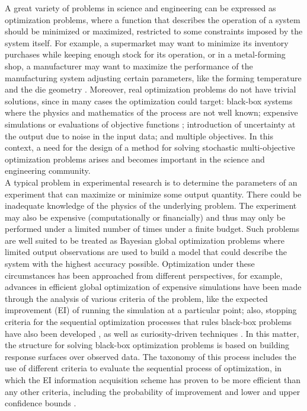\documentclass{article}
\begin{document}
A great variety of problems in science and engineering can be expressed as optimization problems, where a function that describes the operation of a system should be minimized or maximized, restricted to some constraints imposed by the system itself. For example, a supermarket may want to minimize its inventory purchases while keeping enough stock for its operation, or in a metal-forming shop, a manufacturer may want to maximize the performance of the manufacturing system adjusting certain parameters, like the forming temperature and the die geometry \cite{Huang2006}. Moreover, real optimization problems do not have trivial solutions, since in many cases the optimization could target: black-box systems where the physics and mathematics of the process are not well known; expensive simulations or evaluations of objective functions \cite{Jones1998}; introduction of uncertainty at the output due to noise in the input data; and multiple objectives. In this context, a need for the design of a method for solving stochastic multi-objective optimization problems arises and becomes important in the science and engineering community.\\

A typical problem in experimental research is to determine the parameters of an experiment that can maximize or minimize some output quantity. There could be inadequate knowledge of the physics of the underlying problem. The experiment may also be expensive (computationally or financially) and thus may only be performed under a limited number of times under a finite budget. Such problems are well suited to be treated as Bayesian global optimization problems where limited output observations are used to build a model that could describe the system with the highest accuracy possible. Optimization under these circumstances has been approached from different perspectives, for example, advances in efficient global optimization of expensive simulations have been made through the analysis of various criteria of the problem, like the expected improvement (EI) of running the simulation at a particular point; also, stopping criteria for the sequential optimization processes that rules black-box problems have also been developed \cite{Jones1998}, as well as curiosity-driven techniques \cite{Schaul2011}. In this matter, the structure for solving black-box optimization problems is based on building response surfaces over observed data. The taxonomy of this process includes the use of different criteria to evaluate the sequential process of optimization, in which the EI information acquisition scheme has proven to be more efficient than any other criteria, including the probability of improvement and lower and upper confidence bounds \cite{Jones2001}.\\
\end{document}
